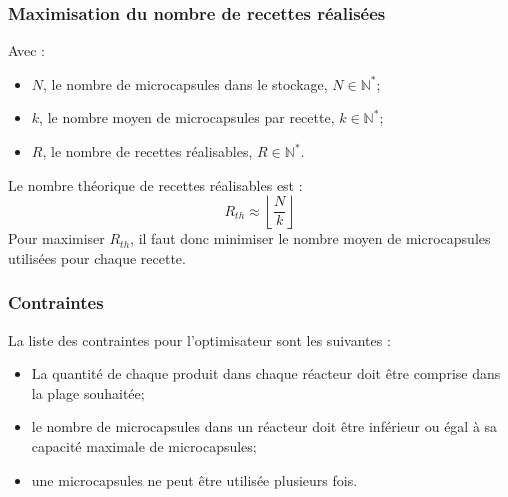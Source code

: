 \subsubsection{Maximisation du nombre de \glspl{recette} réalisées}
Avec :
\begin{itemize}
    \item $N$, le nombre de \glspl{microcapsule} dans le stockage, $N \in \mathbb{N}^*$;
    \item $k$, le nombre moyen de \glspl{microcapsule} par recette, $k\in \mathbb{N}^*$;
    \item $R$, le nombre de \glspl{recette} réalisables, $R\in \mathbb{N}^*$.
\end{itemize}
Le nombre théorique de \glspl{recette} réalisables est :
\begin{equation}
   R_{th} \approx \left\lfloor \frac{N}{k}\right\rfloor
   \label{eq:nbre_recipe_th}
\end{equation}
Pour maximiser $R_{th}$, il faut donc minimiser le nombre moyen de \glspl{microcapsule} utilisées pour chaque recette.
\subsubsection{Contraintes}
La liste des contraintes pour l'optimisateur sont les suivantes :
\begin{itemize}
    \item La quantité de chaque produit dans chaque réacteur doit être comprise dans la plage souhaitée;
    \item le nombre de \glspl{microcapsule} dans un réacteur doit être inférieur ou égal à sa capacité maximale de \glspl{microcapsule};
    \item une \glspl{microcapsule} ne peut être utilisée plusieurs fois.
\end{itemize}
